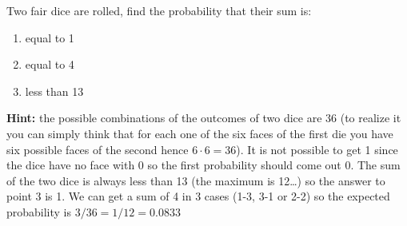 \begin{Exercise}[title={(Dice simulation II)}]
Two fair dice are rolled, find the probability that their sum is:
\begin{enumerate}
	\item equal to 1
	\item equal to 4
	\item less than 13
\end{enumerate}
	
\textbf{Hint:} the possible combinations of the outcomes of two dice are 36 (to realize it you can simply think that for each one of the six faces of the first die you have six possible faces of the second hence $6\cdot 6=36$). It is not possible to get 1 since 	the dice have no face with 0 so the first probability should come out 0. The sum of the two dice is always less than 13 (the maximum is 12\ldots) so the answer to point 3 is 1. We can get a sum of 4 in 3 cases (1-3, 3-1 or 2-2) so the expected probability is $3/36=1/12=0.0833$
\end{Exercise}

